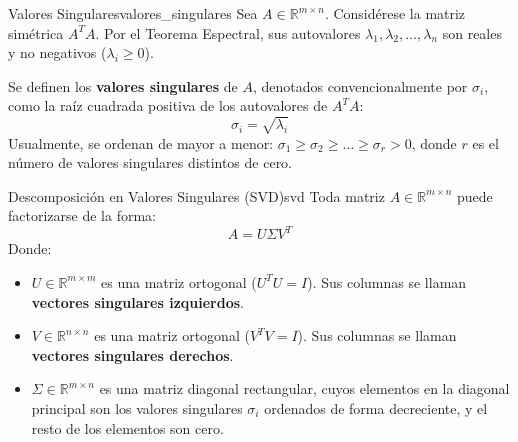 \documentclass[11pt, a4paper]{article}
\begin{document}
\begin{definicion}{Valores Singulares}{valores_singulares}
Sea $A \in \mathbb{R}^{m \times n}$. Considérese la matriz simétrica $A^T A$. Por el Teorema Espectral, sus autovalores $\lambda_1, \lambda_2, \dots, \lambda_n$ son reales y no negativos ($\lambda_i \ge 0$).

Se definen los \textbf{valores singulares} de $A$, denotados convencionalmente por $\sigma_i$, como la raíz cuadrada positiva de los autovalores de $A^T A$:
\[ \sigma_i = \sqrt{\lambda_i} \]
Usualmente, se ordenan de mayor a menor: $\sigma_1 \ge \sigma_2 \ge \dots \ge \sigma_r > 0$, donde $r$ es el número de valores singulares distintos de cero.
\end{definicion}

\begin{teorema}{Descomposición en Valores Singulares (SVD)}{svd}
Toda matriz $A \in \mathbb{R}^{m \times n}$ puede factorizarse de la forma:
\[ A = U \Sigma V^T \]
Donde:
\begin{itemize}
    \item $U \in \mathbb{R}^{m \times m}$ es una matriz ortogonal ($U^T U = I$). Sus columnas se llaman \textbf{vectores singulares izquierdos}.
    \item $V \in \mathbb{R}^{n \times n}$ es una matriz ortogonal ($V^T V = I$). Sus columnas se llaman \textbf{vectores singulares derechos}.
    \item $\Sigma \in \mathbb{R}^{m \times n}$ es una matriz diagonal rectangular, cuyos elementos en la diagonal principal son los valores singulares $\sigma_i$ ordenados de forma decreciente, y el resto de los elementos son cero.
\end{itemize}
\end{teorema}
\end{document}
